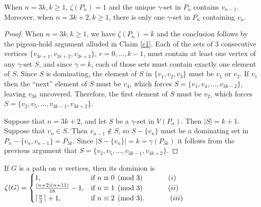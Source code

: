\documentclass[twoside,12pt]{article}
\begin{document}
\begin{claim}{\label{c4}}
	When $n=3k, k\ge 1$, $\zeta(P_n)=1$ and the unique $\gamma$-set in $P_n$ contains $v_{n-1}$. Moreover, when $n=3k+2, k\ge 1$, there is only one $\gamma$-set in $P_n$ containing $v_{n}$. 
\end{claim}
\begin{proof}
	When $n=3k, k\ge 1$,  we have $\zeta(P_n)=k$ and the conclusion follows by the pigeon-hold argument alluded in Claim \ref{c1}. Each of the sets of $3$ consecutive vertices $\{v_{3r+1},v_{3r+2},v_{3r+3}\}$, $r=0,\ldots,k-1$, must contain at least one vertex of any $\gamma$-set $S$, and since $\gamma=k$, each of those sets must contain exactly one element of $S$. Since $S$ is dominating, the element of $S$ in $\{v_1,v_2,v_3\}$ must be $v_1$ or $v_2$. If $v_1$ then the ``next'' element of $S$ must be $v_4$, which forces $S=\{v_1,v_4,\ldots,v_{3k-2}\}$, leaving $v_{3k}$ uncovered. Therefore, the first element of $S$ must be $v_2$, which forces $S=\{v_2,v_5,\ldots,v_{3k-1}, v_{3k+2}\}$.
	
Suppose that $n=3k+2$, and let $S$ be a $\gamma$-set in $V(P_n)$. Then $|S|=k+1$. Suppose that $v_n\in S$. Then $v_{n-1}\notin S$, so $S-\{v_n\}$ must be a dominating set in $P_n-\{v_n,v_{n-1}\}=P_{3k}$. Since $|S-\{v_n\}|=k=\gamma(P_{3k})$ it follows from the previous argument that $S=\{v_2,v_5,\ldots, v_{3k-1}, v_{3k+2}\}$. 
	
\end{proof}
\begin{theorem}{\label{T1}}
	If $G$ is a path on $n$ vertices, then its dominion is \\
	
	$\zeta(G)=\begin{cases} 
	1, & \text{if} \ n \equiv 0\pmod3 \hspace{.5in} (i)\\
	\frac{(n+2)(n+11)}{18}-1, &  \text{if} \ n \equiv 1\pmod3 \hspace{.5in} (ii)\\
	{\lceil \frac{n}{3} \rceil}+1, & \text{if} \ n \equiv 2\pmod3. \hspace{.5in} (iii)
	\end{cases}$
\end{theorem}
\end{document}
